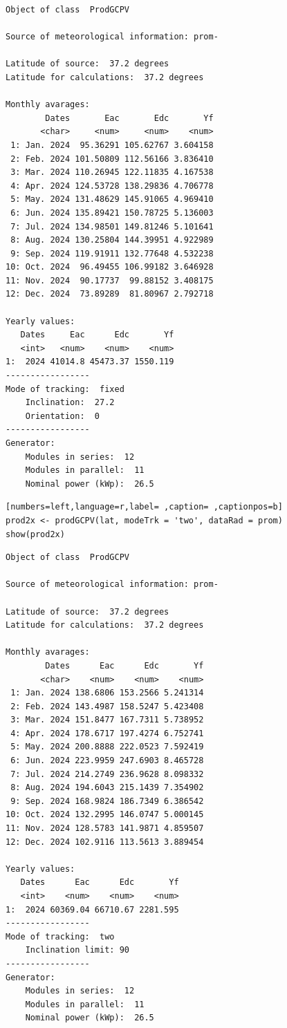 \begin{verbatim}
Object of class  ProdGCPV 

Source of meteorological information: prom- 

Latitude of source:  37.2 degrees
Latitude for calculations:  37.2 degrees

Monthly avarages:
        Dates       Eac       Edc       Yf
       <char>     <num>     <num>    <num>
 1: Jan. 2024  95.36291 105.62767 3.604158
 2: Feb. 2024 101.50809 112.56166 3.836410
 3: Mar. 2024 110.26945 122.11835 4.167538
 4: Apr. 2024 124.53728 138.29836 4.706778
 5: May. 2024 131.48629 145.91065 4.969410
 6: Jun. 2024 135.89421 150.78725 5.136003
 7: Jul. 2024 134.98501 149.81246 5.101641
 8: Aug. 2024 130.25804 144.39951 4.922989
 9: Sep. 2024 119.91911 132.77648 4.532238
10: Oct. 2024  96.49455 106.99182 3.646928
11: Nov. 2024  90.17737  99.88152 3.408175
12: Dec. 2024  73.89289  81.80967 2.792718

Yearly values:
   Dates     Eac      Edc       Yf
   <int>   <num>    <num>    <num>
1:  2024 41014.8 45473.37 1550.119
-----------------
Mode of tracking:  fixed 
    Inclination:  27.2 
    Orientation:  0 
-----------------
Generator:
    Modules in series:  12 
    Modules in parallel:  11 
    Nominal power (kWp):  26.5
\end{verbatim}

\begin{lstlisting}[numbers=left,language=r,label= ,caption= ,captionpos=b]
prod2x <- prodGCPV(lat, modeTrk = 'two', dataRad = prom)
show(prod2x)
\end{lstlisting}

\begin{verbatim}
Object of class  ProdGCPV 

Source of meteorological information: prom- 

Latitude of source:  37.2 degrees
Latitude for calculations:  37.2 degrees

Monthly avarages:
        Dates      Eac      Edc       Yf
       <char>    <num>    <num>    <num>
 1: Jan. 2024 138.6806 153.2566 5.241314
 2: Feb. 2024 143.4987 158.5247 5.423408
 3: Mar. 2024 151.8477 167.7311 5.738952
 4: Apr. 2024 178.6717 197.4274 6.752741
 5: May. 2024 200.8888 222.0523 7.592419
 6: Jun. 2024 223.9959 247.6903 8.465728
 7: Jul. 2024 214.2749 236.9628 8.098332
 8: Aug. 2024 194.6043 215.1439 7.354902
 9: Sep. 2024 168.9824 186.7349 6.386542
10: Oct. 2024 132.2995 146.0747 5.000145
11: Nov. 2024 128.5783 141.9871 4.859507
12: Dec. 2024 102.9116 113.5613 3.889454

Yearly values:
   Dates      Eac      Edc       Yf
   <int>    <num>    <num>    <num>
1:  2024 60369.04 66710.67 2281.595
-----------------
Mode of tracking:  two 
    Inclination limit: 90 
-----------------
Generator:
    Modules in series:  12 
    Modules in parallel:  11 
    Nominal power (kWp):  26.5
\end{verbatim}

